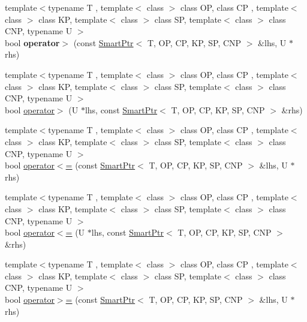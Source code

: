 \begin{DoxyCompactItemize}
\item 
\hypertarget{group__SmartPointerGroup_ga0482b2c131ab426526ff9463fda7f2ea}{}{\footnotesize template$<$typename T , template$<$ class $>$ class O\+P, class C\+P , template$<$ class $>$ class K\+P, template$<$ class $>$ class S\+P, template$<$ class $>$ class C\+N\+P, typename U $>$ }\\bool {\bfseries operator$>$} (const \hyperlink{classLoki_1_1SmartPtr}{Smart\+Ptr}$<$ T, O\+P, C\+P, K\+P, S\+P, C\+N\+P $>$ \&lhs, U $\ast$rhs)\label{group__SmartPointerGroup_ga0482b2c131ab426526ff9463fda7f2ea}

\item 
{\footnotesize template$<$typename T , template$<$ class $>$ class O\+P, class C\+P , template$<$ class $>$ class K\+P, template$<$ class $>$ class S\+P, template$<$ class $>$ class C\+N\+P, typename U $>$ }\\bool \hyperlink{group__SmartPointerGroup_ga00cd20c13933b70e7bb734527502c674}{operator$>$} (U $\ast$lhs, const \hyperlink{classLoki_1_1SmartPtr}{Smart\+Ptr}$<$ T, O\+P, C\+P, K\+P, S\+P, C\+N\+P $>$ \&rhs)
\item 
{\footnotesize template$<$typename T , template$<$ class $>$ class O\+P, class C\+P , template$<$ class $>$ class K\+P, template$<$ class $>$ class S\+P, template$<$ class $>$ class C\+N\+P, typename U $>$ }\\bool \hyperlink{group__SmartPointerGroup_gacdb4a26ac587767f90a6f31fa2b59975}{operator$<$=} (const \hyperlink{classLoki_1_1SmartPtr}{Smart\+Ptr}$<$ T, O\+P, C\+P, K\+P, S\+P, C\+N\+P $>$ \&lhs, U $\ast$rhs)
\item 
{\footnotesize template$<$typename T , template$<$ class $>$ class O\+P, class C\+P , template$<$ class $>$ class K\+P, template$<$ class $>$ class S\+P, template$<$ class $>$ class C\+N\+P, typename U $>$ }\\bool \hyperlink{group__SmartPointerGroup_gae9b52490dde1823ba37309c4435d8757}{operator$<$=} (U $\ast$lhs, const \hyperlink{classLoki_1_1SmartPtr}{Smart\+Ptr}$<$ T, O\+P, C\+P, K\+P, S\+P, C\+N\+P $>$ \&rhs)
\item 
{\footnotesize template$<$typename T , template$<$ class $>$ class O\+P, class C\+P , template$<$ class $>$ class K\+P, template$<$ class $>$ class S\+P, template$<$ class $>$ class C\+N\+P, typename U $>$ }\\bool \hyperlink{group__SmartPointerGroup_ga6ecb015692643d88fa04ba2eaa1bc72e}{operator$>$=} (const \hyperlink{classLoki_1_1SmartPtr}{Smart\+Ptr}$<$ T, O\+P, C\+P, K\+P, S\+P, C\+N\+P $>$ \&lhs, U $\ast$rhs)

\end{DoxyCompactItemize}
